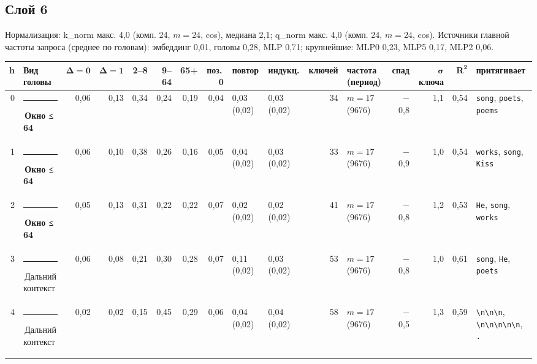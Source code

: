 \documentclass[10pt]{article}
\begin{document}
\par\vspace{0.4em}
\noindent\begin{minipage}{\linewidth}
\subsection*{Слой 6}
{\small\color{ink2} Нормализация: k\_norm макс. 4,0 (комп. 24, $m{=}24$, cos), медиана 2,1; q\_norm макс. 4,0 (комп. 24, $m{=}24$, cos). Источники главной частоты запроса (среднее по головам): эмбеддинг 0,01, головы 0,28, MLP 0,71; крупнейшие: MLP0 0,23, MLP5 0,17, MLP2 0,06.}
\begin{center}{\footnotesize\begin{tabular}{|r|l|r|r|r|r|r|r|l|l|r|l|r|r|r|l|}
\hline
\rowcolor{head}\textbf{h} & \textbf{Вид головы} & $\boldsymbol{\Delta{=}0}$ & $\boldsymbol{\Delta{=}1}$ & \textbf{2–8} & \textbf{9–64} & \textbf{65+} & \textbf{поз.\,0} & \textbf{повтор} & \textbf{индукц.} & \textbf{ключей} & \textbf{частота (период)} & \textbf{спад} & $\boldsymbol{\sigma}$ \textbf{ключа} & $\boldsymbol{R^2}$ & \textbf{притягивает} \\ \hline
0 & \textcolor[HTML]{EDA100}{\rule{0.62em}{0.62em}}\,\textbf{Окно ≤ 64} & 0,06 & 0,13 & 0,34 & 0,24 & 0,19 & 0,04 & 0,03 (0,02) & 0,03 (0,02) & 34 & $m{=}17$ (9676) & $-$0,8 & 1,1 & 0,54 & \texttt{\textvisiblespace{}song}, \texttt{\textvisiblespace{}poets}, \texttt{\textvisiblespace{}poems} \\ \hline
1 & \textcolor[HTML]{EDA100}{\rule{0.62em}{0.62em}}\,\textbf{Окно ≤ 64} & 0,06 & 0,10 & 0,38 & 0,26 & 0,16 & 0,05 & 0,04 (0,02) & 0,03 (0,02) & 33 & $m{=}17$ (9676) & $-$0,9 & 1,0 & 0,54 & \texttt{\textvisiblespace{}works}, \texttt{\textvisiblespace{}song}, \texttt{\textvisiblespace{}Kiss} \\ \hline
2 & \textcolor[HTML]{EDA100}{\rule{0.62em}{0.62em}}\,\textbf{Окно ≤ 64} & 0,05 & 0,13 & 0,31 & 0,22 & 0,22 & 0,07 & 0,02 (0,02) & 0,02 (0,02) & 41 & $m{=}17$ (9676) & $-$0,8 & 1,2 & 0,53 & \texttt{\textvisiblespace{}He}, \texttt{\textvisiblespace{}song}, \texttt{\textvisiblespace{}works} \\ \hline
3 & \textcolor[HTML]{C3C2B7}{\rule{0.62em}{0.62em}}\,Дальний контекст & 0,06 & 0,08 & 0,21 & 0,30 & 0,28 & 0,07 & 0,11 (0,02) & 0,03 (0,02) & 53 & $m{=}17$ (9676) & $-$0,8 & 1,0 & 0,61 & \texttt{\textvisiblespace{}song}, \texttt{\textvisiblespace{}He}, \texttt{\textvisiblespace{}poets} \\ \hline
4 & \textcolor[HTML]{C3C2B7}{\rule{0.62em}{0.62em}}\,Дальний контекст & 0,02 & 0,02 & 0,15 & 0,45 & 0,29 & 0,06 & 0,04 (0,02) & 0,04 (0,02) & 58 & $m{=}17$ (9676) & $-$0,5 & 1,3 & 0,59 & \texttt{\textvisiblespace{}\textbackslash{}n\textbackslash{}n\textbackslash{}n}, \texttt{\textbackslash{}n\textbackslash{}n\textbackslash{}n\textbackslash{}n\textbackslash{}n}, \texttt{\textvisiblespace{}.} \\ \hline

\end{tabular}}
\end{center}
\end{minipage}
\end{document}
